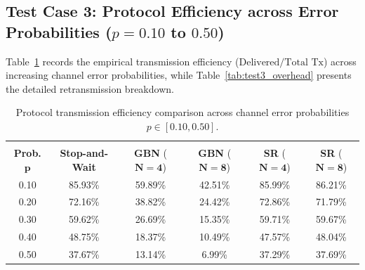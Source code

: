 \documentclass[11pt,a4paper]{article}
\begin{document}
\clearpage
\subsection{Test Case 3: Protocol Efficiency across Error Probabilities \texorpdfstring{(\(p = 0.10\) to \(0.50\))}{(p = 0.10 to 0.50)}}

Table~\ref{tab:test3_noisy} records the empirical transmission efficiency (\(\text{Delivered} / \text{Total Tx}\)) across increasing channel error probabilities, while Table~\ref{tab:test3_overhead} presents the detailed retransmission breakdown.

\begin{table}[!htbp]
    \centering
    \small
    \renewcommand{\arraystretch}{0.94}
    \setlength{\tabcolsep}{5pt}
    \begin{tabular}{cccccc}
        \toprule
        \shortstack{\textbf{Error}\\\textbf{Prob.} \(\boldsymbol{p}\)} & \textbf{Stop-and-Wait} & \textbf{GBN} (\(\boldsymbol{N=4}\)) & \textbf{GBN} (\(\boldsymbol{N=8}\)) & \textbf{SR} (\(\boldsymbol{N=4}\)) & \textbf{SR} (\(\boldsymbol{N=8}\)) \\
        \midrule
        0.10 & 85.93\% & 59.89\% & 42.51\% & 85.99\% & 86.21\% \\
        0.20 & 72.16\% & 38.82\% & 24.42\% & 72.86\% & 71.79\% \\
        0.30 & 59.62\% & 26.69\% & 15.35\% & 59.71\% & 59.67\% \\
        0.40 & 48.75\% & 18.37\% & 10.49\% & 47.57\% & 48.04\% \\
        0.50 & 37.67\% & 13.14\% &  6.99\% & 37.29\% & 37.69\% \\
        \bottomrule
    \end{tabular}
    \caption{Protocol transmission efficiency comparison across channel error probabilities \(p \in [0.10, 0.50]\).}
    \label{tab:test3_noisy}
\end{table}
\end{document}
